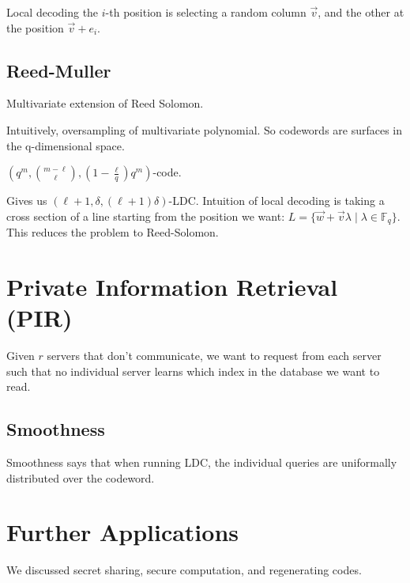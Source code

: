 \documentclass{idc_msc}
\newcommand{\Fq}[1][q]{{\mathbb{F}_{#1}}}
\begin{document}
Local decoding the \(i\)-th position is selecting a random column \(\vec{v}\), and the other at the position \(\vec{v}+e_i\).

\subsection{Reed-Muller}

Multivariate extension of Reed Solomon.

Intuitively, oversampling of multivariate polynomial. So codewords are surfaces in the q-dimensional space.

\(\left(q^m, \binom{m - \ell}{\ell}, \left(1 - \frac{\ell}{q}\right) q^m\right)\)-code.

Gives us \((\ell+1, \delta, (\ell+1)\delta)\)-LDC.
Intuition of local decoding is taking a cross section of a line starting from the position we want: \(L=\{\vec{w}+\vec{v}\lambda \mid \lambda \in \Fq\}\).
This reduces the problem to Reed-Solomon.

\section{Private Information Retrieval (PIR)}

Given \(r\) servers that don't communicate, we want to request from each server such that no individual server learns which index in the database we want to read.

\subsection{Smoothness}

Smoothness says that when running LDC, the individual queries are uniformally distributed over the codeword.

\section{Further Applications}

We discussed secret sharing, secure computation, and regenerating codes.
\end{document}
